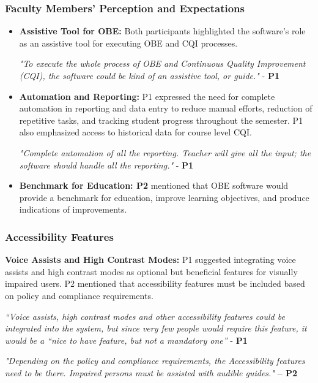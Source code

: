 \documentclass[journal,onecolumn]{IEEEtran}
\begin{document}
\subsubsection{\textbf{Faculty Members' Perception and Expectations}}

\begin{itemize}
    \item \textbf{Assistive Tool for OBE:} Both participants highlighted the software's role as an assistive tool for executing OBE and CQI processes.


\textit{"To execute the whole process of OBE and Continuous Quality Improvement (CQI), the software could be kind of an assistive tool, or guide."} - \textbf{P1}

\item \textbf{Automation and Reporting:} P1 expressed the need for complete automation in reporting and data entry to reduce manual efforts, reduction of repetitive tasks, and tracking student progress throughout the semester. P1 also emphasized access to historical data for course level CQI.

\textit{"Complete automation of all the reporting. Teacher will give all the input; the software should handle all the reporting."} - \textbf{P1}

\item \textbf{Benchmark for Education: P2} mentioned that OBE software would provide a benchmark for education, improve learning objectives, and produce indications of improvements.

\end{itemize}

\subsubsection{\textbf{Accessibility Features}}


\textbf{Voice Assists and High Contrast Modes:} P1 suggested integrating voice assists and high contrast modes as optional but beneficial features for visually impaired users. P2 mentioned that accessibility features must be included based on policy and compliance requirements.

\textit{“Voice assists, high contrast modes and other accessibility features could be integrated into the system, but since very few people would require this feature, it would be a “nice to have feature, but not a mandatory one” }- \textbf{P1}

\textit{"Depending on the policy and compliance requirements, the Accessibility features need to be there. Impaired persons must be assisted with audible guides."} \textbf{– P2} 
\end{document}
